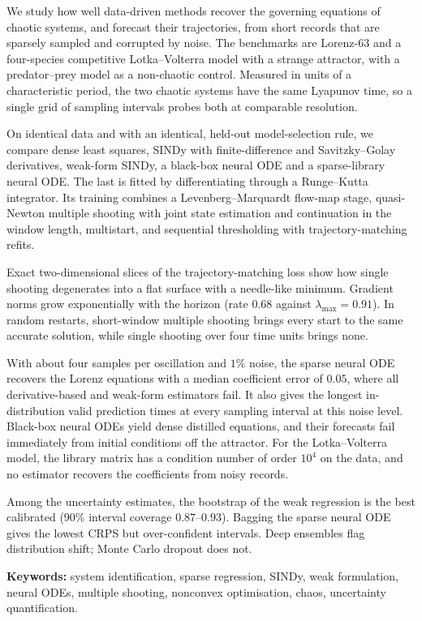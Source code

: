 We study how well data-driven methods recover the governing equations of chaotic systems, and forecast their trajectories, from short records that are sparsely sampled and corrupted by noise. The benchmarks are Lorenz-63 and a four-species competitive Lotka--Volterra model with a strange attractor, with a predator--prey model as a non-chaotic control. Measured in units of a characteristic period, the two chaotic systems have the same Lyapunov time, so a single grid of sampling intervals probes both at comparable resolution.

On identical data and with an identical, held-out model-selection rule, we compare dense least squares, SINDy with finite-difference and Savitzky--Golay derivatives, weak-form SINDy, a black-box neural ODE and a sparse-library neural ODE. The last is fitted by differentiating through a Runge--Kutta integrator. Its training combines a Levenberg--Marquardt flow-map stage, quasi-Newton multiple shooting with joint state estimation and continuation in the window length, multistart, and sequential thresholding with trajectory-matching refits.

Exact two-dimensional slices of the trajectory-matching loss show how single shooting degenerates into a flat surface with a needle-like minimum. Gradient norms grow exponentially with the horizon (rate $0.68$ against $\lambda_{\max}=0.91$). In random restarts, short-window multiple shooting brings every start to the same accurate solution, while single shooting over four time units brings none.

With about four samples per oscillation and $1\%$ noise, the sparse neural ODE recovers the Lorenz equations with a median coefficient error of $0.05$, where all derivative-based and weak-form estimators fail. It also gives the longest in-distribution valid prediction times at every sampling interval at this noise level. Black-box neural ODEs yield dense distilled equations, and their forecasts fail immediately from initial conditions off the attractor. For the Lotka--Volterra model, the library matrix has a condition number of order $10^4$ on the data, and no estimator recovers the coefficients from noisy records.

Among the uncertainty estimates, the bootstrap of the weak regression is the best calibrated (90\% interval coverage $0.87$--$0.93$). Bagging the sparse neural ODE gives the lowest CRPS but over-confident intervals. Deep ensembles flag distribution shift; Monte Carlo dropout does not.

\vspace{1em}\noindent\textbf{Keywords:} system identification, sparse regression, SINDy, weak formulation, neural ODEs, multiple shooting, nonconvex optimisation, chaos, uncertainty quantification.


\vspace{0.8em}
